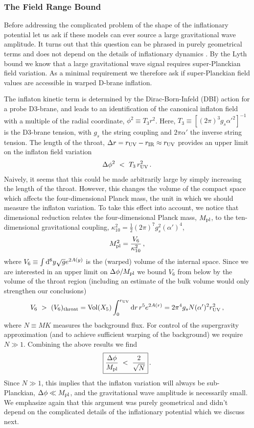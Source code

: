 \documentclass[12pt,letterpaper,rotate]{article}
\def\beq{\begin{equation}}
\def\eeq{\end{equation}}
\def\Mp{M_{\rm pl}}
\def\d{{\rm d}}
\begin{document}
{\subsubsection{The Field Range Bound}

Before addressing the complicated problem of the shape of the inflationary potential let us ask if these models can ever source a large gravitational wave amplitude.
It turns out that this question can be phrased in purely geometrical terms and does not depend on the details of inflationary dynamics \cite{Baumann:2006cd}.
By the Lyth bound we know that a large gravitational wave signal requires super-Planckian field variation. As a minimal requirement we therefore ask if super-Planckian field values are accessible in warped D-brane inflation.

The inflaton kinetic term is determined by the Dirac-Born-Infeld (DBI) action for a probe D3-brane, and leads to an identification of the canonical inflaton field with a multiple of the radial coordinate, $\phi^2 \equiv T_3 r^2$. Here, $T_3 \equiv \left[(2\pi)^3 g_s \alpha'^2 \right]^{-1}$ is the D3-brane tension, with $g_s$ the string coupling and $2\pi\alpha'$ the inverse string tension.  
The length of the throat, $\Delta r = r_{\rm UV} - r_{\rm IR} \approx r_{\rm UV}$ provides an upper limit on the inflaton field variation
\beq
\Delta \phi^2 \ < \ T_3\, r_{\rm UV}^2\, .
\eeq
Naively, it seems that this could be made arbitrarily large by simply increasing the length of the throat. However, this changes the volume of the compact space which affects the four-dimensional Planck mass, the unit in which we should measure the inflaton variation.
To take this effect into account, we notice that
dimensional reduction relates the four-dimensional Planck mass, $\Mp$, to the ten-dimensional gravitational coupling, $\kappa_{10}^2 = \frac{1}{2} (2\pi)^7 g_s^2 (\alpha')^4$, 
\beq
\Mp^2 = \frac{V_6}{\kappa_{10}^2}\, ,
\eeq
where $V_6 \equiv \int \d^6 y \sqrt{g} e^{2A(y)}$ is the (warped) volume of the internal space. Since we are interested in an upper limit on $\Delta \phi/\Mp$ we bound $V_6$ from below by the volume of the throat region (including an estimate of the bulk volume would only strengthen our conclusions)
\beq
V_6 \ > \ (V_6)_{\rm throat} = {\rm Vol}(X_5) \int_0^{r_{\rm UV}} \d r \, r^5 e^{2A(r)} = 2\pi^4 g_s N (\alpha')^2 r_{\rm UV}^2\, ,
\eeq
where $N \equiv M K$ measures the background flux. For control of the supergravity approximation (and to achieve sufficient warping of the background) we require $N \gg 1$.
Combining the above results we find \cite{Baumann:2006cd}
\beq
\fbox{$\displaystyle
\frac{\Delta \phi}{\Mp} \ < \ \frac{2}{\sqrt{N}} $} \, .
\eeq
Since $N \gg 1$, this implies that the inflaton variation will always be sub-Planckian, $\Delta \phi \ll \Mp$,  and the gravitational wave amplitude is necessarily small.
We emphasize again that this argument was purely geometrical and didn't depend on the complicated details of the inflationary potential which we discuss next.

}
\end{document}
